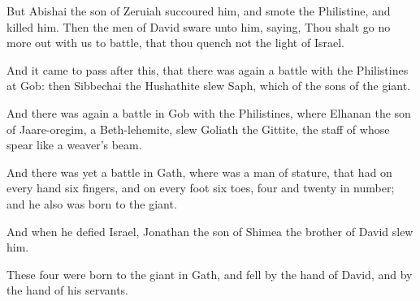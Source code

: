 {But
Abishai the
son of
Zeruiah
succoured him, and
smote the
Philistine, and
killed him. Then the
men of
David
sware unto him,
saying, Thou shalt
go no more out with us to
battle, that thou
quench not the
light of
Israel.

And it came to pass after
this, that there was again a
battle with the
Philistines at
Gob: then
Sibbechai the
Hushathite
slew
Saph, which
{} of the
sons of the
giant.

And there was again a
battle in
Gob with the
Philistines, where
Elhanan the
son of
Jaare-oregim, a
Beth-lehemite,
slew
{}
Goliath the
Gittite, the
staff of whose
spear
{} like a
weaver’s
beam.

And there was yet a
battle in
Gath, where was a
man of
{}
stature, that had on every
hand
six
fingers, and on every
foot
six
toes,
four and
twenty in
number; and he also was
born to the
giant.

And when he
defied
Israel,
Jonathan the
son of
Shimea the
brother of
David
slew him.

These
four were
born to the
giant in
Gath, and
fell by the
hand of
David, and by the
hand of his
servants.




\par }
